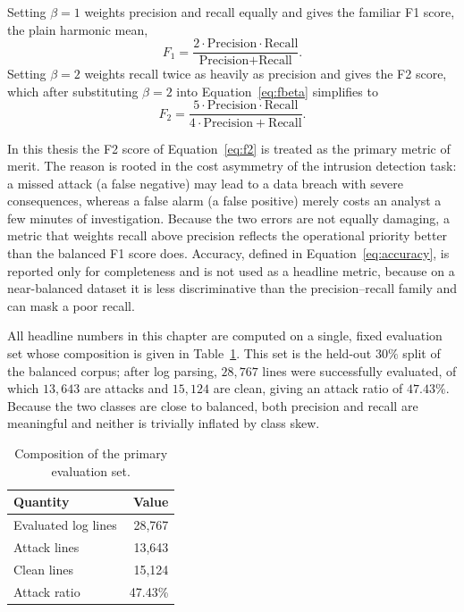 \documentclass[12pt,a4paper]{report}
\begin{document}
Setting $\beta = 1$ weights precision and recall equally and gives the
familiar F1 score, the plain harmonic mean,
\begin{equation}
  F_1 = \frac{2 \cdot \text{Precision} \cdot \text{Recall}}
             {\text{Precision} + \text{Recall}}.
  \label{eq:f1}
\end{equation}
Setting $\beta = 2$ weights recall twice as heavily as precision and gives the
F2 score, which after substituting $\beta = 2$ into
Equation~\ref{eq:fbeta} simplifies to
\begin{equation}
  F_2 = \frac{5 \cdot \text{Precision} \cdot \text{Recall}}
             {4 \cdot \text{Precision} + \text{Recall}}.
  \label{eq:f2}
\end{equation}

In this thesis the F2 score of Equation~\ref{eq:f2} is treated as the primary
metric of merit. The reason is rooted in the cost asymmetry of the intrusion
detection task: a missed attack (a false negative) may lead to a data breach
with severe consequences, whereas a false alarm (a false positive) merely
costs an analyst a few minutes of investigation. Because the two errors are
not equally damaging, a metric that weights recall above precision reflects
the operational priority better than the balanced F1 score does. Accuracy,
defined in Equation~\ref{eq:accuracy}, is reported only for completeness and
is not used as a headline metric, because on a near-balanced dataset it is
less discriminative than the precision--recall family and can mask a poor
recall.

All headline numbers in this chapter are computed on a single, fixed
evaluation set whose composition is given in Table~\ref{tab:evalset}. This
set is the held-out $30\%$ split of the balanced corpus; after log parsing,
$28{,}767$ lines were successfully evaluated, of which $13{,}643$ are
attacks and $15{,}124$ are clean, giving an attack ratio of $47.43\%$.
Because the two classes are close to balanced, both precision and recall are
meaningful and neither is trivially inflated by class skew.

\begin{table}[ht]
  \centering
  \caption{Composition of the primary evaluation set.}
  \label{tab:evalset}
  \renewcommand{\arraystretch}{1.35}
  \setlength{\tabcolsep}{10pt}
  \footnotesize
  \begin{tabular}{|l|r|}
    \hline
    \textbf{Quantity} & \textbf{Value} \\
    \hline
    Evaluated log lines & 28{,}767 \\
    \hline
    Attack lines & 13{,}643 \\
    \hline
    Clean lines & 15{,}124 \\
    \hline
    Attack ratio & 47.43\% \\
    \hline
  \end{tabular}
\end{table}
\end{document}
